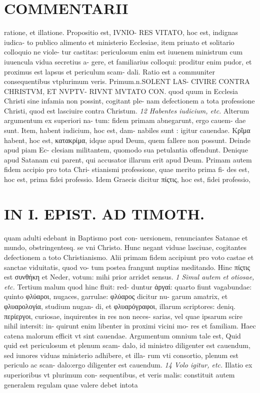 \documentclass{article}
\begin{document}
\begin{pages}
\section*{COMMENTARII }
\marginpar{[ p.128 ]}\pstart ratione, et illatione. Propositio est, IVNIO- RES VITATO, hoc est, indignas iudica- to publico alimento et ministerio Ecclesiae, item priuato et solitario colloquio ne viole- tur castitas: periculosum enim est iuuenem ministrum cum iuuencula vidua secretius a- gere, et familiarius colloqui: proditur enim pudor, et proximus est lapsus et periculum scam- dali. Ratio est a communiter consequentibus vtplurimum veris. Primum.n.SOLENT LAS- CIVIRE CONTRA CHRISTVM, ET NVPTV- RIVNT MVTATO CON. quod quum in Ecclesia Christi sine infamia non possint, cogitant ple- nam defectionem a tota professione Christi, quod est lasciuire contra Christum.  \pend
\textit{12 Habentes iudicium, etc. }\pstart Alterum argumentum ex superiori na- tum: fidem primam abnegarunt, ergo cauem- dae sunt. Item, habent iudicium, hoc est, dam- nabiles sunt : igitur cauendae. Κρῖμα habent, hoc est, κατακρίμα, idque apud Deum, quem fallere non possunt. Deinde apud piam Ec- clesiam militantem, quomodo sua petulantia offendunt. Denique apud Satanam cui parent, qui accusator illarum erit apud Deum.  \pend\pstart Primam autem fidem accipio pro tota Chri- stianismi professione, quae merito prima fi- des est, hoc est, prima fidei professio. Idem Graecis dicitur πίςτις, hoc est, fidei professio,  \pend
\section*{IN I. EPIST. AD TIMOTH. }
\marginpar{[ p.129 ]}\pstart quam adulti edebant in Baptismo post con- uersionem, renunciantes Satanae et mundo, obstringentesq. se vni Christo. Hunc negant viduae lasciuae, cogitantes defectionem a toto Christianismo. Alii primam fidem accipiunt pro voto castae et sanctae viduitatis, quod vo- tum postea frangunt nuptias meditando. Hinc πίςτις est συνθήκη et Neder, votum: mihi prior arridet sensus.  \pend
\textit{1 Simul autem et otiosae, etc. }\pstart Tertium malum quod hinc fluit: red- duntur ἀργαί: quarto fiunt vagabundae: quinto φλύαροι, nugaces, garrulae: φλύαρος dicitur nu- garum amatrix, et φλυαρολογία, studium nugan- di, et φλυαρόγραφοι, illarum scriptores: deniq. περίεργοι, curiosae, inquirentes in res non neces- sarias, vel quae ipsarum scire nihil intersit: in- quirunt enim libenter in proximi vicini mo- res et familiam. Haec catena malorum efficit vt sint cauendae. Argumentum omnium tale est, Quid quid est periculosum et plenum scam- dalo, id ministro diligenter est cauendum, sed iunores viduas ministerio adhibere, et illa- rum vti consortio, plenum est periculo ac scan- dalo:ergo diligenter est cauendum.  \pend
\textit{14 Volo igitur, etc. }\pstart Illatio ex superioribus  vt plurimum con- sequentibus, et veris malis: constituit autem generalem regulam quae valere debet intota  \pend

\end{pages}
\end{document}
